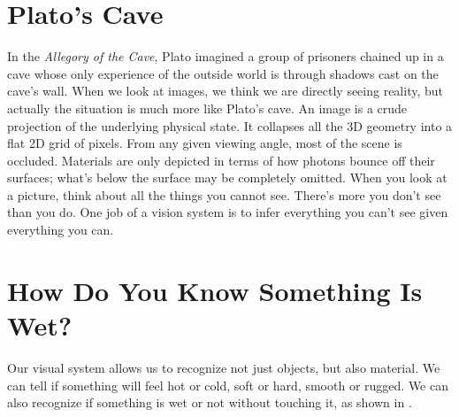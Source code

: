 \section{Plato's Cave}


In the \textit{Allegory of the Cave}, Plato imagined a group of prisoners 
chained up in a cave whose only experience of the outside world is through shadows cast on the cave's wall.
When we look at images, we think we are directly seeing reality, but actually the situation is much more like Plato's cave. An image is a crude projection of the underlying physical state. It collapses all the 3D geometry into a flat 2D grid of pixels. From any given viewing angle, most of the scene is occluded. Materials are only depicted in terms of how photons bounce off their surfaces; what's below the surface may be completely omitted. When you look at a picture, think about all the things you cannot see. There's more you don't see than you do. One job of a vision system is to infer everything you can't see given everything you can.


\section{How Do You Know Something Is Wet?}

Our visual system allows us to recognize not just objects, but also material. We can tell if something will feel hot or cold, soft or hard, smooth or rugged. We can also recognize if something is wet or not without touching it, as shown in \fig{\ref{fig:wet_sand}}. 



